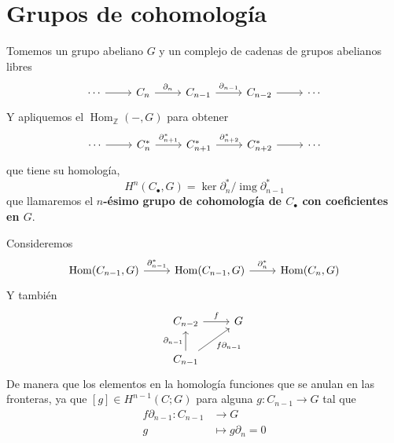 \documentclass[spanish]{book}
\theoremstyle{definition}
\newcommand{\Z}{\mathbb{Z}}
\DeclareMathOperator{\img}{img}
\DeclareMathOperator{\Hom}{Hom}
\begin{document}
\section{Grupos de cohomología}
Tomemos un grupo abeliano $G$ y un complejo de cadenas de grupos abelianos libres
\[\begin{tikzcd}
	\cdots\arrow[r]&C_n\arrow[r,"\partial_n"]&C_{n-1}\arrow[r,"\partial_{n-1}"]&C_{n-2}\arrow[r]&\cdots
\end{tikzcd}\]
Y apliquemos el $\Hom_\Z(-,G)$ para obtener
\[\begin{tikzcd}
	\cdots\arrow[r]&C_n^*\arrow[r,"\partial_{n+1}^*"]&C_{n+1}^*\arrow[r,"\partial^*_{n+2}"]&C_{n+2}^*\arrow[r]&\cdots
\end{tikzcd}\]
que tiene su homología,
\[H^n(C_\bullet,G)=\ker\partial_n^*/\img\partial^*_{n-1}\]
que llamaremos el \textbf{$n$-ésimo grupo de cohomología de $C_\bullet$ con coeficientes en $G$}.

Consideremos
\[\begin{tikzcd}
	\Hom(C_{n-1},G)\arrow[r,"\partial_{n-1}^*"]&\Hom(C_{n-1},G)\arrow[r,"\partial_n^*"]&\Hom(C_n,G)
\end{tikzcd}\]
Y también
\[\begin{tikzcd}
	C_{n-2}\arrow[r,"f"]&G\\
	C_{n-1}\arrow[u,"\partial_{n-1}"]\arrow[ur,"f\partial_{n-1}",swap]
\end{tikzcd}\]
De manera que los elementos en la homología funciones que se anulan en las fronteras, ya que $[g]\in H^{n-1}(C;G)$ para alguna $g:C_{n-1}\to G$ tal que
\begin{align*}
	f\partial_{n-1}:C_{n-1}&\to G\\
	g&\mapsto g\partial_n=0
\end{align*}
\end{document}
